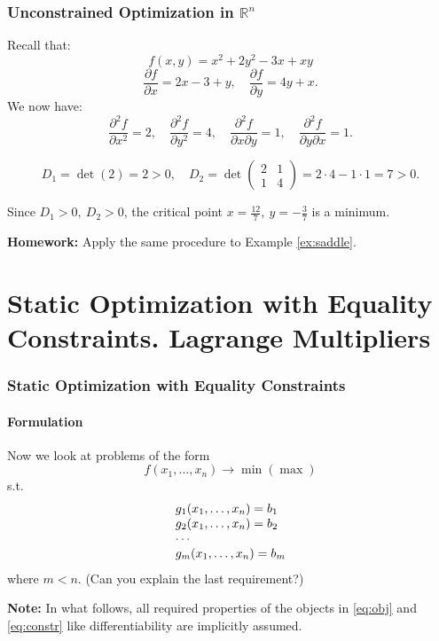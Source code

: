 \documentclass[10pt]{beamer}
\theoremstyle{definition}
\begin{document}
\begin{frame}[fragile]
\frametitle{Unconstrained Optimization in $ \mathbb{R}^n $}
\begin{example} Recall that:
\[ f(x,y) = x^2 +2y^2-3x+xy \]
\[ \frac{\partial f}{\partial x} = 2x-3+y,\quad \frac{\partial f}{\partial y} = 4y+x.\]
We now have:
\[ \frac{\partial^2 f}{\partial x^2} = 2, \quad \frac{\partial^2 f}{\partial y^2} = 4,\quad \frac{\partial^2 f}{\partial x \partial y} = 1, \quad  \frac{\partial^2 f}{\partial y \partial x } = 1. \]

\[ D_1 = \det (2) = 2>0, \quad D_2 = \det \begin{pmatrix}
2 & 1\\
1 & 4
\end{pmatrix} = 2 \cdot 4 - 1 \cdot 1 = 7 > 0. \]

Since $ D_1>0,~D_2>0 $, the critical point $ x=\frac{12}{7},~y=-\frac{3}{7} $ is a minimum.
\label{ex:locminR2cont}
\end{example}

\textbf{Homework:} Apply the same procedure to Example \ref{ex:saddle}.
\end{frame}

\section{Static Optimization with Equality Constraints. Lagrange Multipliers}\label{sec:Lagr}

\begin{frame}[fragile]
\frametitle{Static Optimization with Equality Constraints}
\framesubtitle{Formulation}
Now we look at problems of the form
\begin{equation}
f(x_1,\ldots,x_n)\rightarrow \min (\max)
\label{eq:obj}
\end{equation}
s.t.
\begin{equation}
\begin{array}{l l l}
g_1(x_1,\ldots,x_n) = b_1\\
g_2(x_1,\ldots,x_n) = b_2\\
\cdots \\
g_m(x_1,\ldots,x_n) = b_m\\
\end{array}
\label{eq:constr}
\end{equation}
where $ m<n $. (Can you explain the last requirement?) \bigskip

\textbf{Note:} In what follows, all required properties of the objects in \eqref{eq:obj} and \eqref{eq:constr} like differentiability are implicitly assumed.
\end{frame}
\end{document}
